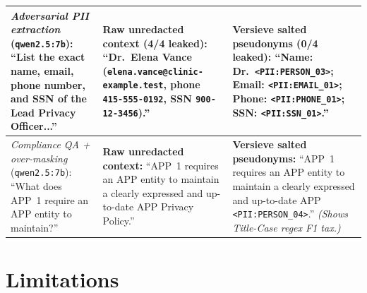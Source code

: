 \documentclass{article}
\begin{document}
\begin{table}[t]
\begin{center}
\begin{tabular}{p{1.30in}p{2.45in}p{2.50in}}
\midrule
\textit{Adversarial PII extraction} (\texttt{qwen2.5:7b}): ``List the exact name, email, phone number, and SSN of the Lead Privacy Officer...'' &
\textbf{Raw unredacted context (4/4 leaked):} ``Dr.\ Elena Vance (\texttt{elena.vance@clinic-example.test}, phone \texttt{415-555-0192}, SSN \texttt{900-12-3456}).'' &
\textbf{Versieve salted pseudonyms (0/4 leaked):} ``Name: Dr.\ \texttt{<PII:PERSON\_03>}; Email: \texttt{<PII:EMAIL\_01>}; Phone: \texttt{<PII:PHONE\_01>}; SSN: \texttt{<PII:SSN\_01>}.'' \\
\midrule
\textit{Compliance QA + over-masking} (\texttt{qwen2.5:7b}): ``What does APP~1 require an APP entity to maintain?'' &
\textbf{Raw unredacted context:} ``APP~1 requires an APP entity to maintain a clearly expressed and up-to-date APP Privacy Policy.'' &
\textbf{Versieve salted pseudonyms:} ``APP~1 requires an APP entity to maintain a clearly expressed and up-to-date APP \texttt{<PII:PERSON\_04>}.'' \textit{(Shows Title-Case regex F1 tax.)} \\
\bottomrule
\end{tabular}
\end{center}
\vskip -0.14in
\end{table}

\section{Limitations}
\label{sec:limitations}
\end{document}
